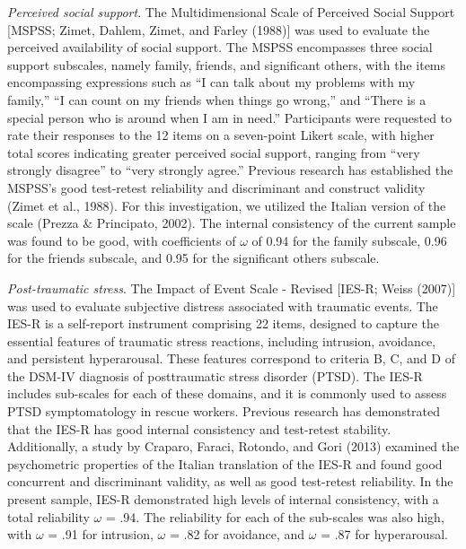 \documentclass[
  man]{apa7}
\begin{document}
\emph{Perceived social support}. The Multidimensional Scale of Perceived Social Support {[}MSPSS; Zimet, Dahlem, Zimet, and Farley (1988){]} was used to evaluate the perceived availability of social support. The MSPSS encompasses three social support subscales, namely family, friends, and significant others, with the items encompassing expressions such as ``I can talk about my problems with my family,'' ``I can count on my friends when things go wrong,'' and ``There is a special person who is around when I am in need.'' Participants were requested to rate their responses to the 12 items on a seven-point Likert scale, with higher total scores indicating greater perceived social support, ranging from ``very strongly disagree'' to ``very strongly agree.'' Previous research has established the MSPSS's good test-retest reliability and discriminant and construct validity (Zimet et al., 1988). For this investigation, we utilized the Italian version of the scale (Prezza \& Principato, 2002). The internal consistency of the current sample was found to be good, with coefficients of \(\omega\) of 0.94 for the family subscale, 0.96 for the friends subscale, and 0.95 for the significant others subscale.

\emph{Post-traumatic stress}. The Impact of Event Scale - Revised {[}IES-R; Weiss (2007){]} was used to evaluate subjective distress associated with traumatic events. The IES-R is a self-report instrument comprising 22 items, designed to capture the essential features of traumatic stress reactions, including intrusion, avoidance, and persistent hyperarousal. These features correspond to criteria B, C, and D of the DSM-IV diagnosis of posttraumatic stress disorder (PTSD). The IES-R includes sub-scales for each of these domains, and it is commonly used to assess PTSD symptomatology in rescue workers. Previous research has demonstrated that the IES-R has good internal consistency and test-retest stability. Additionally, a study by Craparo, Faraci, Rotondo, and Gori (2013) examined the psychometric properties of the Italian translation of the IES-R and found good concurrent and discriminant validity, as well as good test-retest reliability.
In the present sample, IES-R demonstrated high levels of internal consistency, with a total reliability \(\omega\) = .94. The reliability for each of the sub-scales was also high, with \(\omega\) = .91 for intrusion, \(\omega\) = .82 for avoidance, and \(\omega\) = .87 for hyperarousal.
\end{document}
